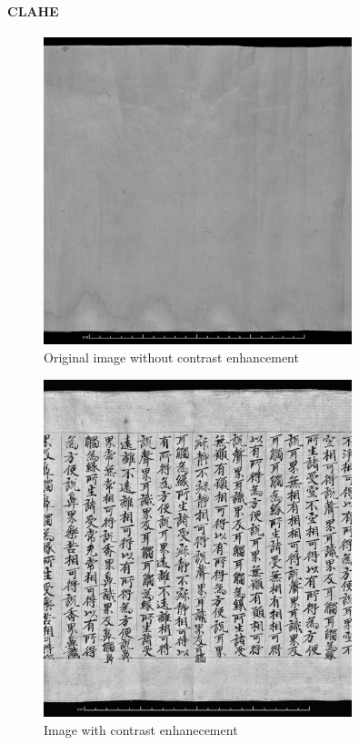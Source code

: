 \paragraph{CLAHE}


\begin{figure}
	\centering
		\includegraphics[width=0.80\textwidth]{img/BLX2565_OR8210S30VB_4_L_original.png}
	\caption{Original image without contrast enhancement}
	\label{fig:BLX2565_OR8210S30VB_4_L_original}
\end{figure}


\begin{figure}
	\centering
		\includegraphics[width=0.80\textwidth]{img/BLX2605_OR8210S61R1_8_L_clahe.png}
	\caption{Image with contrast enhanecement}
	\label{fig:BLX2605_OR8210S61R1_8_L_clahe}
\end{figure}
